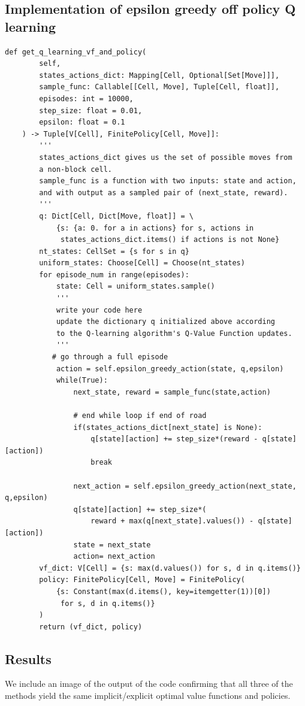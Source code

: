 \documentclass{article}[12pt]
\begin{document}
\subsection{Implementation of epsilon greedy off policy Q learning}
\begin{lstlisting}
def get_q_learning_vf_and_policy(
        self,
        states_actions_dict: Mapping[Cell, Optional[Set[Move]]],
        sample_func: Callable[[Cell, Move], Tuple[Cell, float]],
        episodes: int = 10000,
        step_size: float = 0.01,
        epsilon: float = 0.1
    ) -> Tuple[V[Cell], FinitePolicy[Cell, Move]]:
        '''
        states_actions_dict gives us the set of possible moves from
        a non-block cell.
        sample_func is a function with two inputs: state and action,
        and with output as a sampled pair of (next_state, reward).
        '''
        q: Dict[Cell, Dict[Move, float]] = \
            {s: {a: 0. for a in actions} for s, actions in
             states_actions_dict.items() if actions is not None}
        nt_states: CellSet = {s for s in q}
        uniform_states: Choose[Cell] = Choose(nt_states)
        for episode_num in range(episodes):
            state: Cell = uniform_states.sample()
            '''
            write your code here
            update the dictionary q initialized above according
            to the Q-learning algorithm's Q-Value Function updates.
            '''
           # go through a full episode
            action = self.epsilon_greedy_action(state, q,epsilon)
            while(True):
                next_state, reward = sample_func(state,action)
                
                # end while loop if end of road
                if(states_actions_dict[next_state] is None):
                    q[state][action] += step_size*(reward - q[state][action])
                    break

                next_action = self.epsilon_greedy_action(next_state, q,epsilon)
                q[state][action] += step_size*(
                    reward + max(q[next_state].values()) - q[state][action])
                state = next_state
                action= next_action
        vf_dict: V[Cell] = {s: max(d.values()) for s, d in q.items()}
        policy: FinitePolicy[Cell, Move] = FinitePolicy(
            {s: Constant(max(d.items(), key=itemgetter(1))[0])
             for s, d in q.items()}
        )
        return (vf_dict, policy)
\end{lstlisting}
\subsection{Results}
We include an image of the output of the code confirming that all three of the methods yield the same implicit/explicit optimal value functions and policies.
\end{document}
